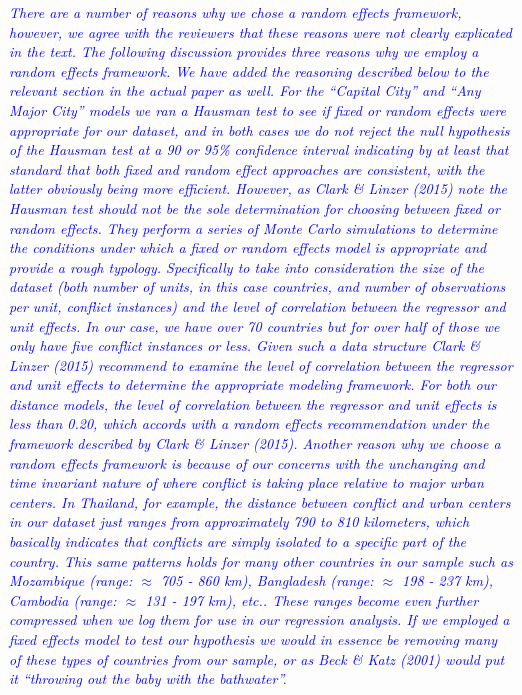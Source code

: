 \begin{enumerate}
\textcolor{blue}{\emph{
	There are a number of reasons why we chose a random effects framework, however, we agree with the reviewers that these reasons were not clearly explicated in the text. The following discussion provides three reasons why we employ a random effects framework. We have added the reasoning described below to the relevant section in the actual paper as well.
	For the ``Capital City'' and ``Any Major City'' models we ran a Hausman test to see if fixed or random effects were appropriate for our dataset, and in both cases we do not reject the null hypothesis of the Hausman test at a 90 or 95\% confidence interval indicating by at least that standard that both fixed and random effect approaches are consistent, with the latter obviously being more efficient.
	However, as Clark \& Linzer (2015) note the Hausman test should not be the sole determination for choosing between fixed or random effects. They perform a series of Monte Carlo simulations to determine the conditions under which a fixed or random effects model is appropriate and provide a rough typology. Specifically to take into consideration the size of the dataset (both number of units, in this case countries, and number of observations per unit, conflict instances) and the level of correlation between the regressor and unit effects. In our case, we have over 70 countries but for over half of those we only have five conflict instances or less. Given such a data structure Clark \& Linzer (2015) recommend to examine the level of correlation between the regressor and unit effects to determine the appropriate modeling framework. For both our distance models, the level of correlation between the regressor and unit effects is less than 0.20, which accords with a random effects recommendation under the framework described by Clark \& Linzer (2015). 
	Another reason why we choose a random effects framework is because of our concerns with the unchanging and time invariant nature of where conflict is taking place relative to major urban centers. In Thailand, for example, the distance between conflict and urban centers in our dataset just ranges from approximately 790 to 810 kilometers, which basically indicates that conflicts are simply isolated to a specific part of the country. This same patterns holds for many other countries in our sample such as Mozambique (range: $\approx$ 705 - 860 km), Bangladesh (range: $\approx$ 198 - 237 km), Cambodia (range: $\approx$ 131 - 197 km), etc.. These ranges become even further compressed when we log them for use in our regression analysis. If we employed a fixed effects model to test our hypothesis we would in essence be removing many of these types of countries from our sample, or as Beck \& Katz (2001) would put it ``throwing out the baby with the bathwater''. 
}}


\end{enumerate}
